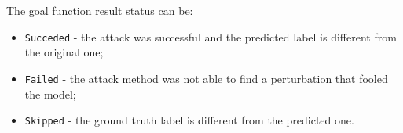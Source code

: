 The goal function result status can be:
\begin{itemize}
    \item \texttt{Succeded} - the attack was successful and the predicted label is different from the original one;
    \item \texttt{Failed} - the attack method was not able to find a perturbation that fooled the model;
    \item \texttt{Skipped} - the ground truth label is different from the predicted one.
\end{itemize}




